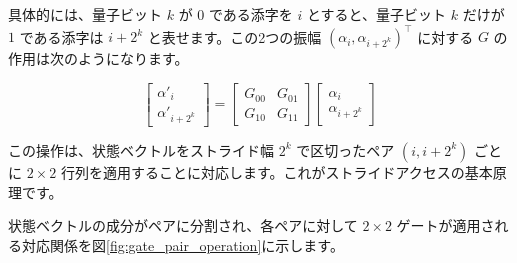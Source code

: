 具体的には、量子ビット $k$ が $0$ である添字を $i$ とすると、量子ビット $k$ だけが $1$ である添字は $i + 2^k$ と表せます。この2つの振幅 $(\alpha_i, \alpha_{i + 2^k})^\top$ に対する $G$ の作用は次のようになります。

\begin{equation}
\begin{bmatrix}
\alpha'_i \\
\alpha'_{i + 2^k}
\end{bmatrix}
=
\begin{bmatrix}
G_{00} & G_{01} \\
G_{10} & G_{11}
\end{bmatrix}
\begin{bmatrix}
\alpha_i \\
\alpha_{i + 2^k}
\end{bmatrix}
\end{equation}

この操作は、状態ベクトルをストライド幅 $2^k$ で区切ったペア $(i, i + 2^k)$ ごとに $2 \times 2$ 行列を適用することに対応します。これがストライドアクセスの基本原理です。

状態ベクトルの成分がペアに分割され、各ペアに対して $2 \times 2$ ゲートが適用される対応関係を図\ref{fig:gate_pair_operation}に示します。


